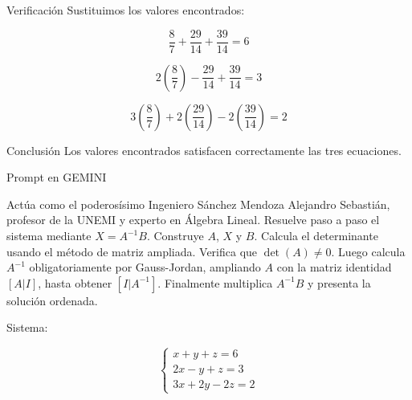 \documentclass[10pt, aspectratio=169]{beamer}
\begin{document}
	\begin{frame}{Verificación}
		Sustituimos los valores encontrados:
		
		\[
		\frac{8}{7}+\frac{29}{14}+\frac{39}{14}=6
		\]
		
		\[
		2\left(\frac{8}{7}\right)-\frac{29}{14}+\frac{39}{14}=3
		\]
		
		\[
		3\left(\frac{8}{7}\right)+2\left(\frac{29}{14}\right)-2\left(\frac{39}{14}\right)=2
		\]
		
		\vspace{0.5cm}
		
		\begin{block}{Conclusión}
			Los valores encontrados satisfacen correctamente las tres ecuaciones.
		\end{block}
	\end{frame}
	\begin{frame}{Prompt en GEMINI}
	\bigskip
	
	Actúa como el poderosísimo Ingeniero Sánchez Mendoza Alejandro Sebastián, profesor de la UNEMI y
	experto en Álgebra Lineal. Resuelve paso a paso el sistema mediante $X = A^{-1}B$. Construye $A$, $X$ y $B$.
	Calcula el determinante usando el método de matriz ampliada. Verifica que $\det(A) \neq 0$. Luego calcula $A^{-1}$
	obligatoriamente por Gauss-Jordan, ampliando $A$ con la matriz identidad $[A|I]$, hasta obtener $[I|A^{-1}]$.
	Finalmente multiplica $A^{-1}B$ y presenta la solución ordenada.
	
	\medskip
	\noindent Sistema:
	
	\[
	\begin{cases}
		x + y + z = 6 \\
		2x - y + z = 3 \\
		3x + 2y - 2z = 2
	\end{cases}
	\]
	\end{frame}
\end{document}
